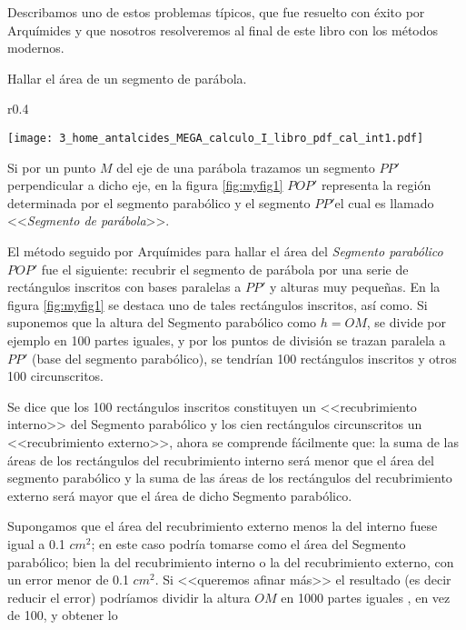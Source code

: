 Describamos uno de estos problemas típicos, que fue resuelto con éxito
por Arquímides y que nosotros resolveremos al final de este libro
con los métodos modernos.

\begin{problema}\label{prob:pro1} 

Hallar el área de un segmento de parábola.

\end{problema}

\begin{solucion}

\begin{wrapfigure}{r}{0.4\linewidth} \centering

\texttt{[image: 3\_home\_antalcides\_MEGA\_calculo\_I\_libro\_pdf\_cal\_int1.pdf]}
\caption{Segmento de una  Parábola $POP'$.}
\label{fig:myfig1} \end{wrapfigure}

Si por un punto $M$ del eje de una parábola trazamos un segmento
$PP'$perpendicular a dicho eje, en la figura \ref{fig:myfig1} $POP'$
representa la región determinada por el segmento parabólico y el segmento
$PP'$el cual es llamado <<\textsl{Segmento de parábola}>>.

El método seguido por Arquímides para hallar el área del \textsl{Segmento
parabólico} $POP'$ fue el siguiente: recubrir el segmento de parábola
por una serie de rectángulos inscritos con bases paralelas a $PP'$
y alturas muy pequeñas. En la figura \ref{fig:myfig1} se destaca
uno de tales rectángulos inscritos, así como. Si suponemos que la
altura del Segmento parabólico como $h=OM$, se divide por ejemplo
en 100 partes iguales, y por los puntos de división se trazan paralela
a $PP'$ (base del segmento parabólico), se tendrían 100 rectángulos
inscritos y otros 100 circunscritos.

Se dice que los 100 rectángulos inscritos constituyen un <<recubrimiento
interno>> del Segmento parabólico y los cien rectángulos circunscritos
un <<recubrimiento externo>>, ahora se comprende fácilmente que:
la suma de las áreas de los rectángulos del recubrimiento interno
será menor que el área del segmento parabólico y la suma de las áreas
de los rectángulos del recubrimiento externo será mayor que el área
de dicho Segmento parabólico.

Supongamos que el área del recubrimiento externo menos la del interno
fuese igual a 0.1 $\si{cm^2}$; en este caso podría tomarse como el
área del Segmento parabólico; bien la del recubrimiento interno o
la del recubrimiento externo, con un error menor de 0.1 $\si{cm^2}$.
Si <<queremos afinar más>> el resultado (es decir reducir el error)
podríamos dividir la altura $OM$ en 1000 partes iguales , en vez
de 100, y obtener lo


\end{solucion}
